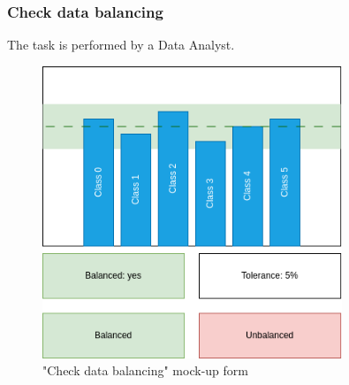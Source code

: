 \subsubsection{Check data balancing}

The task is performed by a Data Analyst.

\begin{figure}[H]
\centering
\includegraphics[width=0.8\textwidth]{figures/check_data_balancing.png}
\caption{"Check data balancing" mock-up form}
\end{figure}

